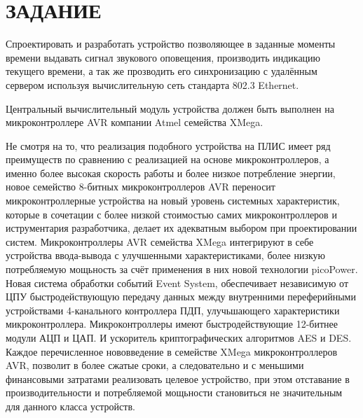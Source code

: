 \section*{ЗАДАНИЕ}

\begin{par}
Спроектировать и разработать устройство позволяющее в заданные моменты времени выдавать сигнал
звукового оповещения, производить индикацию текущего времени, а так же прозводить его синхронизацию
с удалённым сервером используя вычислительную сеть стандарта 802.3 Ethernet.
\end{par}

\begin{par}
Центральный вычислительный модуль устройства должен быть выполнен на микроконтроллере AVR компании
Atmel семейства XMega.
\end{par}

\begin{par}
Не смотря на то, что реализация подобного устройства на ПЛИС имеет ряд преимуществ по
сравнению с реализацией на основе микроконтроллеров, а именно более высокая скорость
работы и более низкое потребление энергии, новое семейство 8-битных микроконтроллеров
AVR переносит микроконтроллерные устройства на новый уровень системных характеристик,
которые в сочетации с более низкой стоимостью самих микроконтроллеров и иструментария
разработчика, делает их адекватным выбором при проектировании систем. Микроконтроллеры
AVR семейства XMega интегрируют в себе устройства ввода-вывода с улучшенными характеристиками,
более низкую потребляемую мощьность за счёт применения в них новой технологии picoPower.
Новая система обработки событий Event System, обеспечивает независимую от ЦПУ
быстродействующую передачу данных между внутренними переферийными устройствами 4-канального
контроллера ПДП, улучьшающего характеристики микроконтроллера. Микроконтроллеры имеют
быстродействующие 12-битнее модули АЦП и ЦАП. И ускоритель криптографических алгоритмов AES и DES.
Каждое перечисленное нововведение в семействе XMega микроконтроллеров AVR, позволит
в более сжатые сроки, а следовательно и с меньшими финансовыми затратами реализовать
целевое устройство, при этом отставание в производительности и потребляемой мощьности
становиться не значительным для данного класса устройств.
\end{par}

